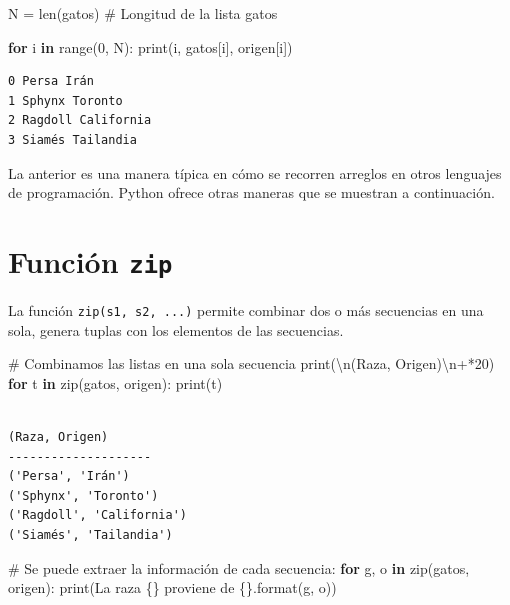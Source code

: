 \documentclass[
  spanish,
  letterpaper,
]{scrbook}
\newenvironment{Shaded}{\begin{snugshade}}{\end{snugshade}}
\newcommand{\BuiltInTok}[1]{\textcolor[rgb]{0.00,0.23,0.31}{#1}}
\newcommand{\CharTok}[1]{\textcolor[rgb]{0.13,0.47,0.30}{#1}}
\newcommand{\CommentTok}[1]{\textcolor[rgb]{0.37,0.37,0.37}{#1}}
\newcommand{\ControlFlowTok}[1]{\textcolor[rgb]{0.00,0.23,0.31}{\textbf{#1}}}
\newcommand{\DecValTok}[1]{\textcolor[rgb]{0.68,0.00,0.00}{#1}}
\newcommand{\KeywordTok}[1]{\textcolor[rgb]{0.00,0.23,0.31}{\textbf{#1}}}
\newcommand{\NormalTok}[1]{\textcolor[rgb]{0.00,0.23,0.31}{#1}}
\newcommand{\OperatorTok}[1]{\textcolor[rgb]{0.37,0.37,0.37}{#1}}
\newcommand{\SpecialCharTok}[1]{\textcolor[rgb]{0.37,0.37,0.37}{#1}}
\newcommand{\StringTok}[1]{\textcolor[rgb]{0.13,0.47,0.30}{#1}}
\theoremstyle{definition}
\theoremstyle{remark}
\begin{document}
\begin{Shaded}
\begin{Highlighting}[]
\NormalTok{N }\OperatorTok{=} \BuiltInTok{len}\NormalTok{(gatos) }\CommentTok{\# Longitud de la lista gatos}

\ControlFlowTok{for}\NormalTok{ i }\KeywordTok{in} \BuiltInTok{range}\NormalTok{(}\DecValTok{0}\NormalTok{, N):}
    \BuiltInTok{print}\NormalTok{(i, gatos[i], origen[i])}
\end{Highlighting}
\end{Shaded}

\begin{verbatim}
0 Persa Irán
1 Sphynx Toronto
2 Ragdoll California
3 Siamés Tailandia
\end{verbatim}

La anterior es una manera típica en cómo se recorren arreglos en otros
lenguajes de programación. Python ofrece otras maneras que se muestran a
continuación.

\section{\texorpdfstring{Función
\texttt{zip}}{Función zip}}\label{funciuxf3n-zip}

La función \texttt{zip(s1,\ s2,\ ...)} permite combinar dos o más
secuencias en una sola, genera tuplas con los elementos de las
secuencias.

\begin{Shaded}
\begin{Highlighting}[]
\CommentTok{\# Combinamos las listas en una sola secuencia}
\BuiltInTok{print}\NormalTok{(}\StringTok{\textquotesingle{}}\CharTok{\textbackslash{}n}\StringTok{(Raza, Origen)}\CharTok{\textbackslash{}n}\StringTok{\textquotesingle{}}\OperatorTok{+}\StringTok{\textquotesingle{}{-}\textquotesingle{}}\OperatorTok{*}\DecValTok{20}\NormalTok{)}
\ControlFlowTok{for}\NormalTok{ t }\KeywordTok{in} \BuiltInTok{zip}\NormalTok{(gatos, origen):}
    \BuiltInTok{print}\NormalTok{(t)}
\end{Highlighting}
\end{Shaded}

\begin{verbatim}

(Raza, Origen)
--------------------
('Persa', 'Irán')
('Sphynx', 'Toronto')
('Ragdoll', 'California')
('Siamés', 'Tailandia')
\end{verbatim}

\begin{Shaded}
\begin{Highlighting}[]
\CommentTok{\# Se puede extraer la información de cada secuencia:}
\ControlFlowTok{for}\NormalTok{ g, o }\KeywordTok{in} \BuiltInTok{zip}\NormalTok{(gatos, origen):}
    \BuiltInTok{print}\NormalTok{(}\StringTok{\textquotesingle{}La raza }\SpecialCharTok{\{\}}\StringTok{ proviene de }\SpecialCharTok{\{\}}\StringTok{\textquotesingle{}}\NormalTok{.}\BuiltInTok{format}\NormalTok{(g, o))}
\end{Highlighting}
\end{Shaded}
\end{document}
